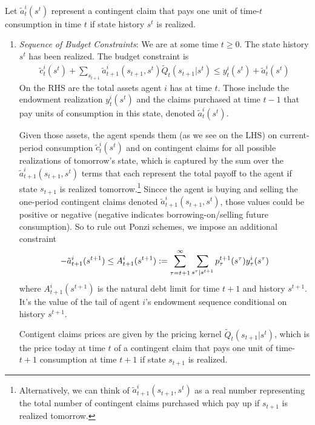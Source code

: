 \documentclass[12pt]{article}
\theoremstyle{plain}
\theoremstyle{definition}
\theoremstyle{remark}
\begin{document}
Let $\tilde{a}^i_t(s^t)$ represent a contingent claim that pays one unit
of time-$t$ consumption in time $t$ if state history $s^t$ is realized.
\begin{enumerate}
  \item \emph{Sequence of Budget Constraints}:
    We are at some time $t\geq 0$. The state history $s^t$ has been
    realized. The budget constraint is
    \begin{align*}
      \tilde{c}_t^i(s^t)
      + \sum_{s_{t+1}}
      \tilde{a}^i_{t+1}(s_{t+1},s^t)
      \tilde{Q}_t(s_{t+1}|s^t)
      \leq y^i_t(s^t) + \tilde{a}_t^i(s^t)
    \end{align*}
    On the RHS are the total assets agent $i$ has at time $t$. Those
    include the endowment realization $y^i_t(s^t)$ and the claims
    purchased at time $t-1$ that pay units of consumption in this state,
    denoted $\tilde{a}_t^i(s^t)$.

    Given those assets, the agent spends them (as we see on the LHS) on
    current-period consumption $\tilde{c}_t^i(s^t)$ and on contingent
    claims for all possible realizations of tomorrow's state, which is
    captured by the sum over the $\tilde{a}^i_{t+1}(s_{t+1},s^t)$ terms
    that each represent the total payoff to the agent if state $s_{t+1}$
    is realized tomorrow.\footnote{%
      Alternatively, we can think of $\tilde{a}^i_{t+1}(s_{t+1},s^t)$ as
      a real number representing the total number of contingent claims
      purchased which pay up if $s_{t+1}$ is realized tomorrow.
    }
    Sincce the agent is buying and selling the one-period contingent
    claims denoted $\tilde{a}^i_{t+1}(s_{t+1},s^t)$, those values could
    be positive or negative (negative indicates borrowing-on/selling
    future consumption). So to rule out Ponzi schemes, we impose an
    additional constraint
    \begin{align*}
      -\tilde{a}^i_{t+1}(s^{t+1}) \leq
      A^i_{t+1}(s^{t+1})
      :=
      \sum^\infty_{\vphantom{s^\tau|s^{t+1}}\tau = t+1} \sum_{s^\tau|s^{t+1}}
      p^{t+1}_\tau (s^\tau)y_\tau^i(s^\tau)
    \end{align*}
    where $A^i_{t+1}(s^{t+1})$ is the natural debt limit for time $t+1$
    and history $s^{t+1}$.
    It's the value of the tail of agent $i$'s endowment sequence
    conditional on history $s^{t+1}$.

    Contigent claims prices are given by the pricing kernel
    $\tilde{Q}_t(s_{t+1}|s^t)$, which is the price today at time $t$ of
    a contingent claim that pays one unit of time-$t+1$ consumption at
    time $t+1$ if state $s_{t+1}$ is realized.
\end{enumerate}
\end{document}

